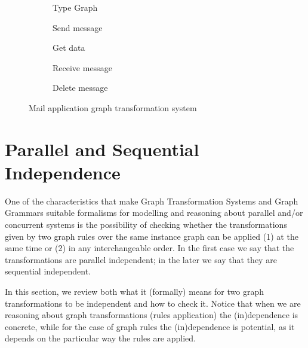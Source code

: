 \begin{example}
\begin{figure}[!ht]
  \centering
  \begin{subfigure}[t]{.5\textwidth}
    \centerline{}
    \caption{Type Graph}
  \end{subfigure}
  \begin{subfigure}[t]{.5\textwidth}
    \centerline{}
    \caption{Send message}
  \end{subfigure}%
  \begin{subfigure}[t]{.5\textwidth}
    \centerline{}
    \caption{Get data}
  \end{subfigure}
  \begin{subfigure}[t]{.5\textwidth}
    \centerline{}
    \caption{Receive message}
  \end{subfigure}%
  \begin{subfigure}[t]{.5\textwidth}
    \centerline{}
    \caption{Delete message}
  \end{subfigure}
  \caption{Mail application graph transformation system}\label{fig:gts:mail}
\end{figure}
\end{example}

\section{Parallel and Sequential Independence}

One of the characteristics that make Graph Transformation Systems and Graph Grammars suitable formalisms for modelling and reasoning about parallel and/or concurrent systems is the possibility of checking whether the transformations given by two graph rules over the same instance graph can be applied (1) at the same time or (2) in any interchangeable order. In the first case we say that the transformations are parallel independent; in the later we say that they are sequential independent.

In this section, we review both what it (formally) means for two graph transformations to be independent and how to check it. Notice that when we are reasoning about graph transformations (rules application) the (in)dependence is concrete, while for the case of graph rules the (in)dependence is potential, as it depends on the particular way the rules are applied.

